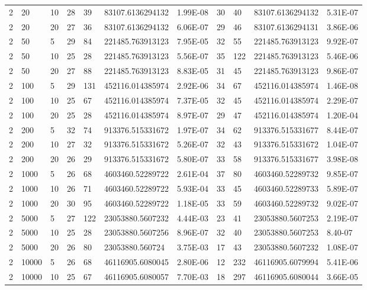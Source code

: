 \begin{center}
\begin{table}
\begin{center}
\begin{tabular}{|l|l|l|l|l|l|l|l|l|l|l|}
      2 &  20 & 10 & 28 & 39 & 83107.6136294132 & 1.99E-08 & 30 & 40 & 83107.6136294132 & 5.31E-07\\
      2 &  20 & 20 & 27 & 36 & 83107.6136294132 & 6.06E-07 & 29 & 46 & 83107.6136294131 & 3.86E-06\\
      2 &  50 & 5 & 29 & 84 & 221485.763913123 & 7.95E-05 & 32 & 55 & 221485.763913123 & 9.92E-07\\
      2 &  50 & 10 & 25 & 28 & 221485.763913123 & 5.56E-07 & 35 & 122 & 221485.763913123 & 5.46E-06\\
      2 &  50 & 20 & 27 & 88 & 221485.763913123 & 8.83E-05 & 31 & 45 & 221485.763913123 & 9.86E-07\\
      2 &  100 & 5 & 29 & 131 & 452116.014385974 & 2.92E-06 & 34 & 67 & 452116.014385974 & 1.46E-08\\
      2 &  100 & 10  & 25 & 67 & 452116.014385974 & 7.37E-05 & 32 & 45 & 452116.014385974 & 2.29E-07\\
      2 &  100 & 20  & 25 & 28 & 452116.014385974 & 8.97E-07 & 29 & 47 & 452116.014385974 & 1.20E-04\\
      2 &  200 & 5 & 32 & 74 & 913376.515331672 & 1.97E-07 & 34 & 62 & 913376.515331677 & 8.44E-07\\
      2 &  200 & 10  & 27 & 32 & 913376.515331672 & 5.26E-07 & 32 & 43 & 913376.515331672 & 1.04E-07\\
      2 &  200 & 20  & 26 & 29 & 913376.515331672 & 5.80E-07 & 33 & 58 & 913376.515331677 & 3.98E-08\\
      2 &  1000 & 5  & 26 & 68 & 4603460.52289722 & 2.61E-04 & 37 & 80 & 4603460.52289732 & 9.85E-07\\
      2 &  1000 & 10  & 26 & 71 & 4603460.52289722 & 5.93E-04 & 33 & 45 & 4603460.52289733 & 5.89E-07\\
      2 &  1000 & 20  & 30 & 95 & 4603460.52289722 & 1.18E-05 & 33 & 59 & 4603460.52289732 & 9.02E-07\\
      2 & 5000 & 5 & 27 & 122 & 23053880.5607232 & 4.44E-03 & 23 & 41 & 23053880.5607253 & 2.19E-07\\
      2 & 5000 & 10 & 25 & 28 & 23053880.5607256 & 8.96E-07 & 32 & 40 & 23053880.5607253 & 8.40-07\\
      2 & 5000 & 20 & 26 & 80 & 23053880.560724 & 3.75E-03 & 17 & 43 & 23053880.5607232 & 1.08E-07\\
      2 & 10000 & 5 & 26 & 68 & 46116905.6080045 & 2.80E-06 & 12 & 232 & 46116905.6079994 & 5.41E-06\\
      2 & 10000 & 10 & 25 & 67 & 46116905.6080057 & 7.70E-03 & 18 & 297 & 46116905.6080044 & 3.66E-05\\

\end{tabular}
\end{center}
\end{table}
\end{center}
